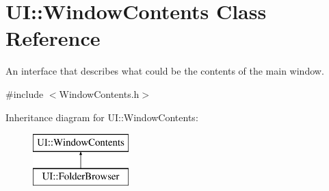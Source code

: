 \hypertarget{class_u_i_1_1_window_contents}{\section{U\-I\-:\-:Window\-Contents Class Reference}
\label{class_u_i_1_1_window_contents}
}


An interface that describes what could be the contents of the main window.  




{\ttfamily \#include $<$Window\-Contents.\-h$>$}

Inheritance diagram for U\-I\-:\-:Window\-Contents\-:\begin{figure}[H]
\begin{center}
\leavevmode
\includegraphics[height=2.000000cm]{class_u_i_1_1_window_contents}
\end{center}
\end{figure}
